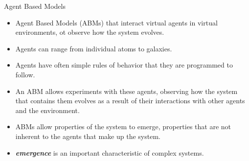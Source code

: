 \begin{frame}{Agent Based Models}
	\begin{itemize}
		\item Agent Based Models (ABMs) that interact virtual agents in virtual environments, ot observe how the system evolves.
		\item Agents can range from individual atoms to galaxies.
		\item Agents have often simple rules of behavior that they are programmed to follow.
		\item An ABM allows experiments with these agents, observing how the system that contains them evolves as a result of their interactions with other agents and the environment.
		\item ABMs allow properties of the system to emerge, properties that are not inherent to the agents that make up the system.
		\item \textit{\textbf{emergence}} is an important characteristic of complex systems.
	\end{itemize}
\end{frame}


